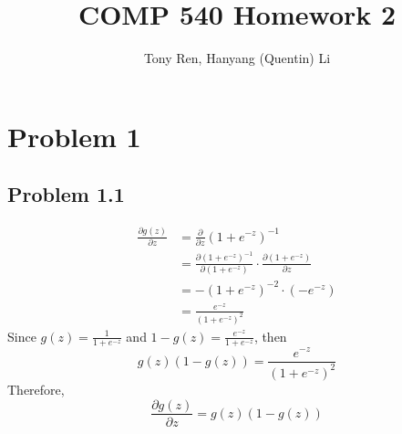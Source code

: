 \documentclass[12pt]{article}
\title{\textbf{COMP 540 Homework 2}}
\author{Tony Ren, Hanyang (Quentin) Li }
\begin{document}
\maketitle

\section*{Problem 1}
\subsection*{Problem 1.1}
\begin{equation} \label{eq1}
\begin{split}
\frac{\partial g(z)}{\partial z}  & =\frac{\partial }{\partial z}(1+e^{-z})^{-1}  \\
 & =\frac{\partial (1+e^{-z})^{-1}}{\partial (1+e^{-z})} \cdot \frac{\partial (1+e^{-z})}{\partial z}\\
 & =-(1+e^{-z})^{-2} \cdot (-e^{-z})\\
 & =\frac{e^{-z}}{(1+e^{-z})^{2}} 
\end{split}
\end{equation}
Since $g(z) = \frac{1}{1+e^{-z}}$ and $1-g(z) = \frac{e^{-z}}{1+e^{-z}}$, then 
$$g(z)(1-g(z)) = \frac{e^{-z}}{(1+e^{-z})^{2}}$$
Therefore,
$$\frac{\partial g(z)}{\partial z}  = g(z)(1-g(z)) $$
\end{document}
